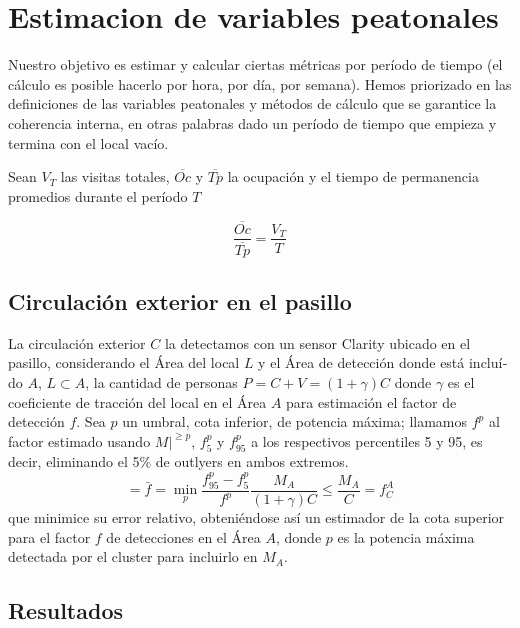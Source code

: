 \section{Estimacion de variables peatonales}

Nuestro objetivo es estimar y calcular ciertas métricas por período de tiempo
(el cálculo es posible hacerlo por hora, por día, por semana).
Hemos priorizado en las definiciones de las variables peatonales 
y métodos de cálculo que se garantice la coherencia interna, en otras palabras
dado un período de tiempo que empieza y termina con el local vacío.


Sean $V_T$ las visitas totales, $\overline{Oc}$ y $\overline{Tp}$ 
la ocupación y el tiempo de permanencia promedios durante el período $T$

\begin{equation} 
   \frac{\overline{Oc}}{\overline{Tp}} = \frac{V_T}{T}
   \label{eq:OcTpVT}
\end{equation}

\subsection{Circulación exterior en el pasillo}
La circulación exterior $C$ la detectamos con un sensor Clarity ubicado en el pasillo,
considerando el Área del local $L$ y el Área de detección donde está incluí­do $A$, $L \subset A$,
la cantidad de personas $P = C + V = (1 + \gamma)C$ donde $\gamma$ es el coeficiente de tracción del local
en el Área $A$ para estimación el factor de detección $f$.
Sea $p$ un umbral, cota inferior, de potencia máxima; llamamos $f^p$ al factor estimado usando $M\big|^{\ge p}$,
$f_{5}^p$ y $f_{95}^p$ a los respectivos percentiles 5 y 95,
es decir, eliminando el 5\% de outlyers en ambos extremos.
\[
= \bar{f} = \min_p \frac{f_{95}^p - f_5^p}{f^p}
\frac{M_A}{(1 + \gamma)C} 
\le \frac{M_A}{C} = f^A_C 
\]
que minimice su error relativo, obteniéndose así un
estimador de la cota superior para el factor $f$ de detecciones en el Área $A$,
donde $p$ es la potencia máxima detectada por el cluster para incluirlo en $M_A$. 

\subsection{Resultados}

